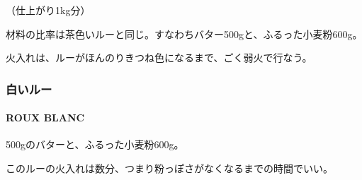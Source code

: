 \documentclass[twoside,12Q,b5j]{escoffierltjsbook}
\newenvironment{recette}{\begin{small}\begin{spacing}{1}\begin{multicols}{2}}{\end{multicols}\end{spacing}\end{small}}
\begin{document}
\begin{recette}

（仕上がり1kg分）

材料の比率は茶色いルーと同じ。すなわちバター500gと、ふるった小麦粉600g。

火入れは、ルーがほんのりきつね色になるまで、ごく弱火で行なう。

\vspace*{1.7\zw}

\subsubsection{白いルー}\label{ux767dux3044ux30ebux30fc}

\paragraph{ROUX BLANC}\label{roux-blanc}


500gのバターと、ふるった小麦粉600g。

このルーの火入れは数分、つまり粉っぽさがなくなるまでの時間でいい。

\end{recette}
{\printindex}
\end{document}
